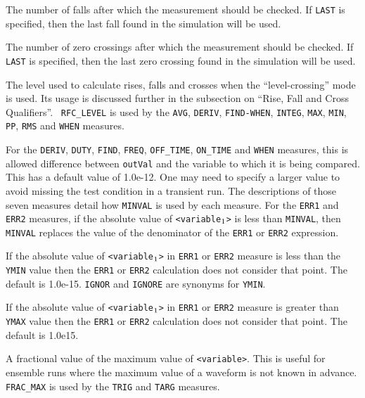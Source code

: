 \begin{Command}
\begin{Arguments}
The number of falls after which the measurement should be checked.  If
\texttt{LAST} is specified, then the last fall found in the simulation
will be used.


The number of zero crossings after which the measurement should be
checked.  If \texttt{LAST} is specified, then the last zero crossing
found in the simulation will be used.


The level used to calculate rises, falls and crosses when the
``level-crossing'' mode is used.  Its usage is discussed further in
the subsection on ``Rise, Fall and Cross Qualifiers''.  {\tt
RFC\_LEVEL} is used by the {\tt AVG}, {\tt DERIV}, {\tt FIND-WHEN},
{\tt INTEG}, {\tt MAX}, {\tt MIN}, {\tt PP}, {\tt RMS} and
{\tt WHEN} measures.


For the {\tt DERIV}, {\tt DUTY}, {\tt FIND}, {\tt FREQ}, {\tt OFF\_TIME},
{\tt ON\_TIME} and {\tt WHEN} measures, this is allowed difference between
\texttt{outVal} and the variable to  which it is being compared.  This has
a default value of 1.0e-12.  One may need to specify a larger value to avoid
missing the test condition in a transient run.  The descriptions of those
seven measures detail how {\tt MINVAL} is used by each measure.  For the
{\tt ERR1} and {\tt ERR2} measures, if the absolute value of
{\tt <variable\(\sb{1}\)>} is less than {\tt MINVAL}, then {\tt MINVAL} replaces
the value of the denominator of the {\tt ERR1} or {\tt ERR2} expression.


If the absolute value of {\tt <variable\(\sb{1}\)>} in {\tt ERR1} or
{\tt ERR2} measure is less than the {\tt YMIN} value then the {\tt ERR1} or
{\tt ERR2} calculation does not consider that point. The default is 1.0e-15.
{\tt IGNOR} and {\tt IGNORE} are synonyms for {\tt YMIN}.


If the absolute value of {\tt <variable\(\sb{1}\)>} in {\tt ERR1} or
{\tt ERR2} measure is greater than {\tt YMAX} value then the {\tt ERR1} or
{\tt ERR2} calculation does not consider that point. The default is 1.0e15.


A fractional value of the maximum value of \texttt{<variable>}.  This
is useful for ensemble runs where the maximum value of a waveform is
not known in advance.  {\tt FRAC\_MAX} is used by the {\tt TRIG} and
{\tt TARG} measures.


\end{Arguments}
\end{Command}
